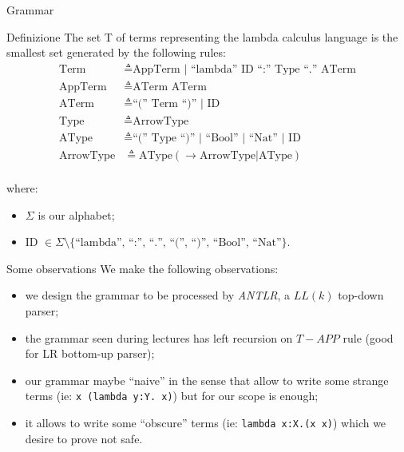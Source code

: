 \documentclass[8pt]{beamer}
\begin{document}
\begin{frame}{Grammar}
  \begin{block}{Definizione}
    The set T of terms representing the lambda calculus language is the
    smallest set generated by the following rules:
  \begin{displaymath}
    \begin{split}
      \text{Term} &\triangleq \text{AppTerm | ``lambda'' ID ``:'' Type ``.''
        ATerm}\\
      \text{AppTerm} &\triangleq \text{ATerm ATerm} \\
      \text{ATerm} &\triangleq \text{``('' Term ``)'' | ID}\\
      \text{Type} &\triangleq \text{ArrowType}\\
      \text{AType} &\triangleq \text{``('' Type ``)'' | ``Bool'' |
        ``Nat'' | ID}\\
      \text{ArrowType} &\triangleq \text{AType} (\rightarrow
      \text{ArrowType} | \text{AType})\\
    \end{split}
  \end{displaymath}
\end{block}
where:
\begin{itemize}
    \item $\Sigma$ is our alphabet;
    \item ID $\in \Sigma \setminus \{ \text{``lambda'', ``:'', ``.'',
  ``('', ``)'', ``Bool'', ``Nat''} \}$.
\end{itemize}

\end{frame}

\begin{frame}{Some observations}
    We make the following observations:
      \begin{itemize}
        \item we design the grammar to be processed by \emph{ANTLR}, a $LL(k)$
            top-down parser;
        \item the grammar seen during lectures has left recursion on 
            $T-APP$ rule (good for LR bottom-up parser);
        \item our grammar maybe ``naive'' in the sense that allow to write 
            some strange terms (ie: \texttt{x (lambda y:Y. x)}) but for our 
            scope is enough;
        \item it allows to write some ``obscure'' terms (ie: 
            \texttt{lambda x:X.(x x)}) which we desire to prove not safe.
    \end{itemize}
\end{frame}
\end{document}
